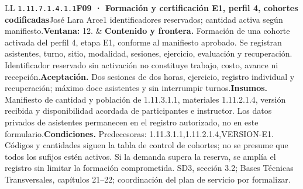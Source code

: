 \begin{longtable}{L{\tabcolsep\relax}L{\tabcolsep\relax}}
\texttt{1.\allowbreak{}11.\allowbreak{}7.\allowbreak{}1.\allowbreak{}4.\allowbreak{}1.\allowbreak{}1}\newline{}\textbf{F09 · Formación y certificación E1, perfil 4, cohortes codificadas}\newline{}José Lara Arce\newline{}1 identificadores reservados; cantidad activa según manifiesto.\newline{}\textbf{Ventana:} 12. & \textbf{Contenido y frontera.} Formación de una cohorte activada del perfil 4, etapa E1, conforme al manifiesto aprobado. Se registran asistentes, turno, sitio, modalidad, sesiones, ejercicio, evaluación y recuperación. Identificador reservado sin activación no constituye trabajo, costo, avance ni recepción.\newline{}\textbf{Aceptación.} Dos sesiones de dos horas, ejercicio, registro individual y recuperación; máximo doce asistentes y sin interrumpir turnos.\newline{}\textbf{Insumos.} Manifiesto de cantidad y población de 1.11.3.1.1, materiales 1.11.2.1.4, versión recibida y disponibilidad acordada de participantes e instructor. Los datos privados de asistentes permanecen en el registro autorizado, no en este formulario.\newline{}\textbf{Condiciones.} Predecesoras: 1.11.3.1.1,1.11.2.1.4,VERSION-E1. Códigos y cantidades siguen la tabla de control de cohortes; no se presume que todos los sufijos estén activos. Si la demanda supera la reserva, se amplía el registro sin limitar la formación comprometida. SD3, sección 3.2; Bases Técnicas Transversales, capítulos 21--22; coordinación del plan de servicio por formalizar.\\\hline

\end{longtable}
